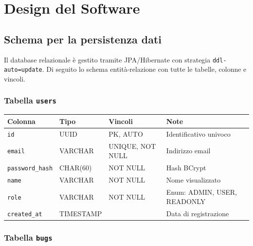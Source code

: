 
\section{Design del Software}

\subsection{Schema per la persistenza dati}

Il database relazionale è gestito tramite JPA/Hibernate con strategia
\texttt{ddl-auto=update}. Di seguito lo schema entità-relazione con tutte le
tabelle, colonne e vincoli.

\subsubsection{Tabella \texttt{users}}

\begin{center}
\small
\begin{tabular}{|l|l|l|p{4cm}|}
\hline
\textbf{Colonna} & \textbf{Tipo} & \textbf{Vincoli} & \textbf{Note} \\
\hline
\texttt{id} & UUID & PK, AUTO & Identificativo univoco \\
\hline
\texttt{email} & VARCHAR & UNIQUE, NOT NULL & Indirizzo email \\
\hline
\texttt{password\_hash} & CHAR(60) & NOT NULL & Hash BCrypt \\
\hline
\texttt{name} & VARCHAR & NOT NULL & Nome visualizzato \\
\hline
\texttt{role} & VARCHAR & NOT NULL & Enum: ADMIN, USER, READONLY \\
\hline
\texttt{created\_at} & TIMESTAMP & & Data di registrazione \\
\hline
\end{tabular}
\end{center}

\subsubsection{Tabella \texttt{bugs}}

